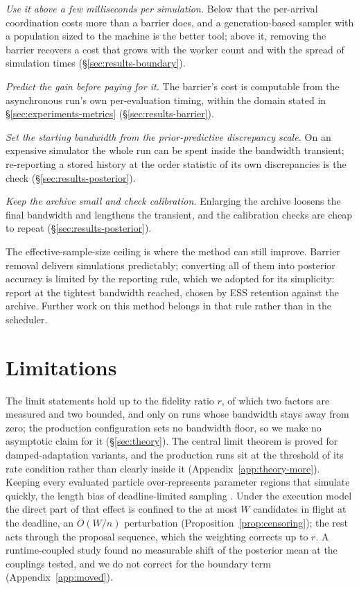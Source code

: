 \documentclass[10pt]{article}
\theoremstyle{plain}
\theoremstyle{definition}
\begin{document}
\emph{Use it above a few milliseconds per simulation.} Below that the per-arrival coordination costs more than a barrier does, and a generation-based sampler with a population sized to the machine is the better tool; above it, removing the barrier recovers a cost that grows with the worker count and with the spread of simulation times (\S\ref{sec:results-boundary}).

\emph{Predict the gain before paying for it.} The barrier's cost is computable from the asynchronous run's own per-evaluation timing, within the domain stated in \S\ref{sec:experiments-metrics} (\S\ref{sec:results-barrier}).

\emph{Set the starting bandwidth from the prior-predictive discrepancy scale.} On an expensive simulator the whole run can be spent inside the bandwidth transient; re-reporting a stored history at the order statistic of its own discrepancies is the check (\S\ref{sec:results-posterior}).

\emph{Keep the archive small and check calibration.} Enlarging the archive loosens the final bandwidth and lengthens the transient, and the calibration checks are cheap to repeat (\S\ref{sec:results-posterior}).

The effective-sample-size ceiling is where the method can still improve. Barrier removal delivers simulations predictably; converting all of them into posterior accuracy is limited by the reporting rule, which we adopted for its simplicity: report at the tightest bandwidth reached, chosen by ESS retention against the archive. Further work on this method belongs in that rule rather than in the scheduler.

\section{Limitations}\label{sec:limitations}
The limit statements hold up to the fidelity ratio $r$, of which two factors are measured and two bounded, and only on runs whose bandwidth stays away from zero; the production configuration sets no bandwidth floor, so we make no asymptotic claim for it (\S\ref{sec:theory}). The central limit theorem is proved for damped-adaptation variants, and the production runs sit at the threshold of its rate condition rather than clearly inside it (Appendix~\ref{app:theory-more}). Keeping every evaluated particle over-represents parameter regions that simulate quickly, the length bias of deadline-limited sampling \citep{murray2021anytime}. Under the execution model the direct part of that effect is confined to the at most $W$ candidates in flight at the deadline, an $O(W/n)$ perturbation (Proposition~\ref{prop:censoring}); the rest acts through the proposal sequence, which the weighting corrects up to $r$. A runtime-coupled study found no measurable shift of the posterior mean at the couplings tested, and we do not correct for the boundary term (Appendix~\ref{app:moved}).
\end{document}
